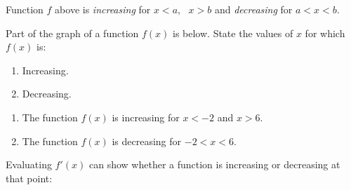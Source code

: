 \documentclass[
  11pt,
  openany]{book}
\begin{document}
\vspace{-1cm}

Function \(f\) above is \textit{increasing} for \(x<a,\text{ }x>b\) and \textit{decreasing} for \(a<x<b\).

\begin{tcolorbox}[title=Example 9.1.1,colback=blue!1, colframe=blue!70!black!70!]
Part of the graph of a function $f(x)$ is below. State the values of $x$ for which $f(x)$ is:\\[0.1em]

\begin{enumerate}
    \item[(a)] Increasing.
    \item[(b)] Decreasing.
\end{enumerate}

\vspace{-2.3cm}
\begin{center}
\end{center}

\tcblower

\begin{enumerate}
    \item[(a)] The function $f(x)$ is increasing for $x<-2$ and $x>6$.
    \item[(b)] The function $f(x)$ is decreasing for $-2<x<6$.
\end{enumerate}

\end{tcolorbox}

\vspace{0.5cm}

Evaluating \(f'(x)\) can show whether a function is increasing or decreasing at that point:

\vspace{0.5cm}
\end{document}
